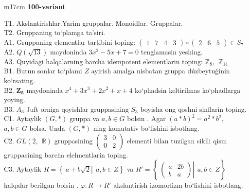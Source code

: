 \documentclass{article}
\begin{document}
\begin{tabular}{m{17cm}}
\textbf{100-variant}
\newline

T1. Akslantirishlar.Yarim gruppalar. Monoidlar. Gruppalar. \\
T2. Gruppaning to`plamga ta'siri. \\
A1. Gruppaning elementlar tartibini toping: \(\begin{pmatrix}
1 & 7 & 4 & 3
\end{pmatrix} \circ \begin{pmatrix}
2 & 6 & 5
\end{pmatrix} \in S_{7}\) \\
A2. \(Q(\sqrt{13})\) maydoninda \(3x^{2} - 5x + 7 = 0\) tenglamasin yeshing. \\
A3. Quyidagi halqalarning barcha idempotent elementlarin toping: \(\mathbb{Z}_{8},\ \ \mathbb{Z}_{14}\) \\
B1. Butun sonlar to`plami \(Z\) ayirish amalga nisbatan gruppa dúzbeytuǵinin ko`rsating. \\
B2. \(\mathbf{Z}_{\mathbf{5}}\) maydoninda \(x^{4} + 3x^{3} + 2x^{2} + x + 4\) ko`phadsin keltirilmas ko`phadlarga yoying. \\
B3. \(A_{3}\) Juft orniga qoyishlar gruppasining \(S_{3}\) boyisha o\textquotesingle ng qo\textquotesingle shni sinflarin toping. \\
C1. Aytaylik \((G,*)\) gruppa va \(a,b \in G\) bo\textquotesingle lsin . Agar \((a*b)^{2} = a^{2}*b^{2}\), \(a,b \in G\) bolsa, Unda \((G,*)\) ning komutativ bo`lishini isbotlang. \\
C2. \(GL(2,\mathbb{\ \ R})\) gruppasining \(\begin{pmatrix}
3 & 0 \\
0 & 2
\end{pmatrix}\) elementi bilan tuzilgan siklli qism gruppasining barcha elelmentlarin toping. \\
C3. Aytaylik \(R = \left\{ \left. \ a + b\sqrt{2} \right|\ \ a,b \in Z \right\}\) va \(R' = \left\{ \left. \ \begin{pmatrix}
a & 2b \\
b & a
\end{pmatrix} \right|\ \ a,b \in Z \right\}\) halqalar berilgan bo\textquotesingle lsin . \(\varphi:R \rightarrow R'\) akslantirish izomorfizm bo`lishini isbotlang. \\

\end{tabular}
\vspace{1cm}
\end{document}
